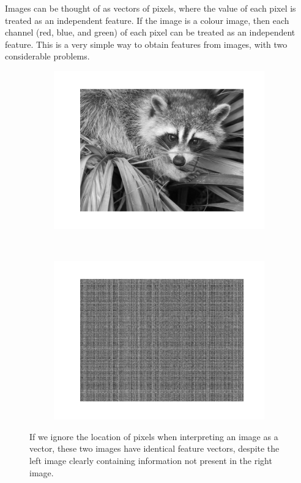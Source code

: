         Images can be thought of as vectors of pixels, where the value of each
        pixel is treated as an independent feature. If the image is a colour
        image, then each channel (red, blue, and green) of each pixel can be
        treated as an independent feature. This is a very simple way to obtain
        features from images, with two considerable problems.

        \begin{figure}
            \centering
            \begin{subfigure}[t]{0.5\textwidth}
                \centering
                \includegraphics[width=\textwidth]{images/face.png}
            \end{subfigure}%
            ~
            \begin{subfigure}[t]{0.5\textwidth}
                \centering
                \includegraphics[width=\textwidth]{images/face_shuffled.png}
            \end{subfigure}
            \caption{If we ignore the location of pixels when interpreting an
                image as a vector, these two images have identical feature
                vectors, despite the left image clearly containing information
                not present in the right image.}
            \label{fig:shuffled-face}
        \end{figure}

